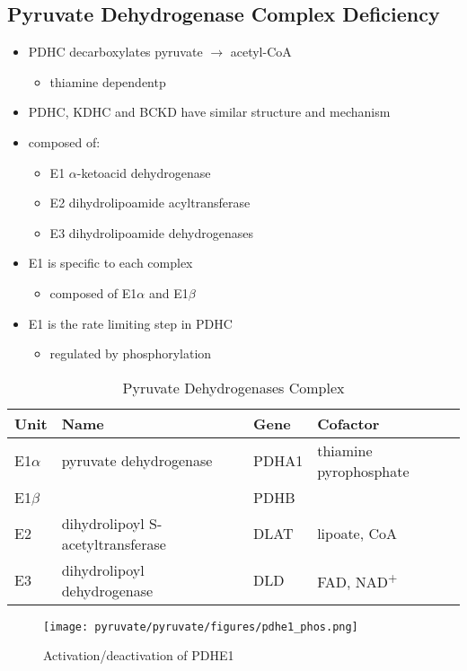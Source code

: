 \documentclass{scrartcl}
\begin{document}
\subsection{Pyruvate Dehydrogenase Complex Deficiency}
\label{sec:org48cb4ed}
\begin{itemize}
\item PDHC decarboxylates pyruvate \(\to\) acetyl-CoA
\begin{itemize}
\item thiamine dependentp
\end{itemize}
\item PDHC, KDHC and BCKD have similar structure and mechanism
\item composed of:
\begin{itemize}
\item E1 \(\alpha\)-ketoacid dehydrogenase
\item E2 dihydrolipoamide acyltransferase
\item E3 dihydrolipoamide dehydrogenases
\end{itemize}
\item E1 is specific to each complex
\begin{itemize}
\item composed of E1\(\alpha\) and E1\(\beta\)
\end{itemize}
\item E1 is the rate limiting step in PDHC
\begin{itemize}
\item regulated by phosphorylation
\end{itemize}
\end{itemize}

\begin{table}[htbp]
\caption{\label{tab:orgec8353e}Pyruvate Dehydrogenases Complex}
\centering
\begin{tabular}{llll}
Unit & Name & Gene & Cofactor\\
\hline
E1\(\alpha\) & pyruvate dehydrogenase & PDHA1 & thiamine pyrophosphate\\
E1\(\beta\) &  & PDHB & \\
E2 & dihydrolipoyl  S-acetyltransferase & DLAT & lipoate, CoA\\
E3 & dihydrolipoyl dehydrogenase & DLD & FAD, NAD\textsuperscript{+}\\
\end{tabular}
\end{table}

\begin{figure}[htbp]
\centering
\texttt{[image: pyruvate/pyruvate/figures/pdhe1\_phos.png]}
\caption[pdhe1]{\label{fig:orgf873aa5}Activation/deactivation of PDHE1}
\end{figure}
\end{document}
